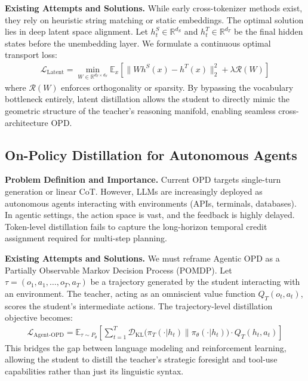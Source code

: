 \documentclass{article} %
\begin{document}
\textbf{Existing Attempts and Solutions.} While early cross-tokenizer methods exist, they rely on heuristic string matching or static embeddings. The optimal solution lies in deep latent space alignment. Let $h_t^S \in \mathbb{R}^{d_S}$ and $h_t^T \in \mathbb{R}^{d_T}$ be the final hidden states before the unembedding layer. We formulate a continuous optimal transport loss:
\begin{align}
\mathcal{L}_{\text{Latent}} = \min_{W \in \mathbb{R}^{d_T \times d_S}} \mathbb{E}_{x} \left[ \parallel W h^S(x) - h^T(x) \parallel_2^2 + \lambda \mathcal{R}(W) \right]
\end{align}
where $\mathcal{R}(W)$ enforces orthogonality or sparsity. By bypassing the vocabulary bottleneck entirely, latent distillation allows the student to directly mimic the geometric structure of the teacher's reasoning manifold, enabling seamless cross-architecture OPD.

\subsection{On-Policy Distillation for Autonomous Agents}
\textbf{Problem Definition and Importance.} Current OPD targets single-turn generation or linear CoT. However, LLMs are increasingly deployed as autonomous agents interacting with environments (APIs, terminals, databases). In agentic settings, the action space is vast, and the feedback is highly delayed. Token-level distillation fails to capture the long-horizon temporal credit assignment required for multi-step planning.

\textbf{Existing Attempts and Solutions.} We must reframe Agentic OPD as a Partially Observable Markov Decision Process (POMDP). Let $\tau = (o_1, a_1, \dots, o_T, a_T)$ be a trajectory generated by the student interacting with an environment. The teacher, acting as an omniscient value function $Q_T(o_t, a_t)$, scores the student's intermediate actions. The trajectory-level distillation objective becomes:
\begin{align}
\mathcal{L}_{\text{Agent-OPD}} = \mathbb{E}_{\tau \sim P_\theta} \left[ \sum_{t=1}^T \mathcal{D}_{\text{KL}}\Big( \pi_T(\cdot | h_t) \parallel \pi_\theta(\cdot | h_t) \Big) \cdot Q_T(h_t, a_t) \right]
\end{align}
This bridges the gap between language modeling and reinforcement learning, allowing the student to distill the teacher's strategic foresight and tool-use capabilities rather than just its linguistic syntax.
\end{document}
